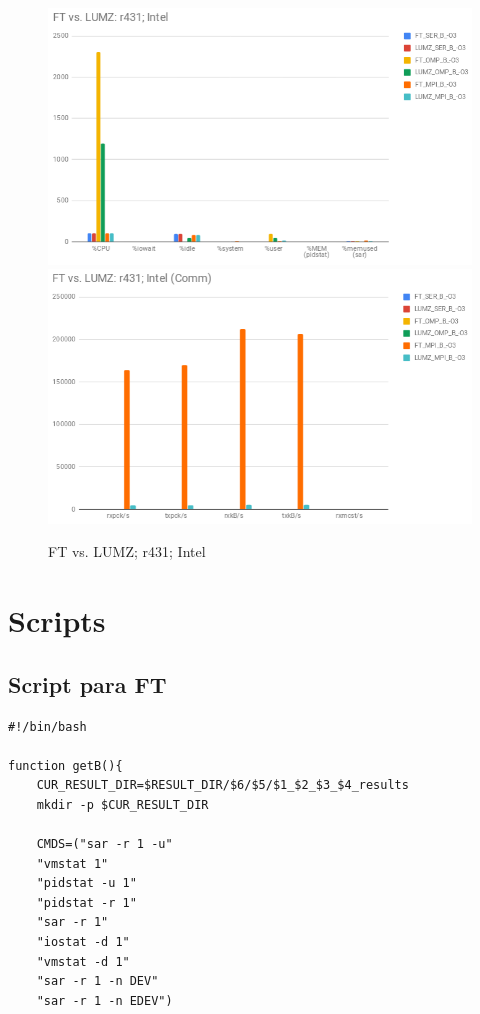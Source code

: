 \documentclass{article}
\begin{document}
\begin{appendices}
\begin{figure}[H]
    \centering
    \includegraphics[width=12cm]{Pictures/FT_LUMZ_r431_Intel_Comp.png}
    \includegraphics[width=12cm]{Pictures/FT_LUMZ_r431_Intel_Comm.png}
    \caption{FT vs. LUMZ; r431; Intel}
    \label{fig:FT_LUMZ_r431}
\end{figure}

\section{Scripts}

\subsection{Script para FT}\label{FTscript}
\begin{verbatim}
#!/bin/bash

function getB(){
    CUR_RESULT_DIR=$RESULT_DIR/$6/$5/$1_$2_$3_$4_results
    mkdir -p $CUR_RESULT_DIR

    CMDS=("sar -r 1 -u"
    "vmstat 1"
    "pidstat -u 1"
    "pidstat -r 1"
    "sar -r 1"
    "iostat -d 1"
    "vmstat -d 1"
    "sar -r 1 -n DEV"
    "sar -r 1 -n EDEV")


\end{verbatim}
\end{appendices}
\end{document}
